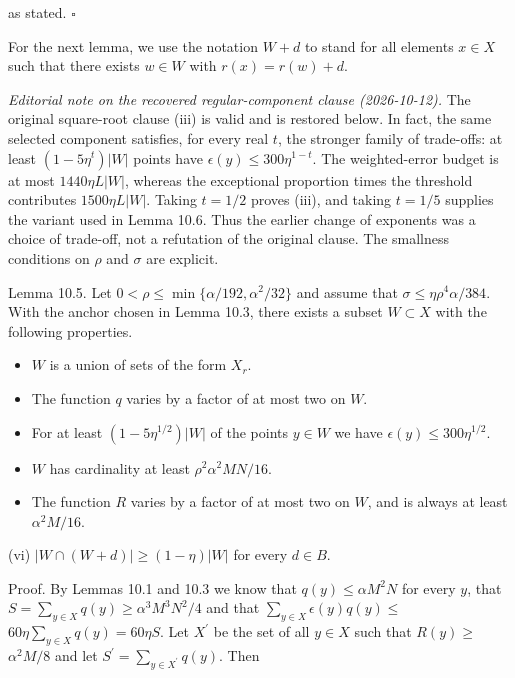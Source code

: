 \documentclass[10pt]{article}
\begin{document}
as stated. \(\square\)

For the next lemma, we use the notation $W+d$ to stand for all elements $x \in X$ such that there exists $w \in W$ with $r(x)=r(w)+d$.

\emph{Editorial note on the recovered regular-component clause (2026-10-12).}
The original square-root clause (iii) is valid and is restored below.
In fact, the same selected component satisfies, for every real $t$, the
stronger family of trade-offs: at least $(1-5\eta^t)|W|$ points have
$\epsilon(y)\leqslant300\eta^{1-t}$. The weighted-error budget is at most
$1440\eta L|W|$, whereas the exceptional proportion times the threshold
contributes $1500\eta L|W|$. Taking $t=1/2$ proves (iii), and taking
$t=1/5$ supplies the variant used in Lemma 10.6. Thus the earlier change
of exponents was a choice of trade-off, not a refutation of the original
clause. The smallness conditions on $\rho$ and $\sigma$ are explicit.

Lemma 10.5. Let $0<\rho\leqslant\min\{\alpha/192,\alpha^2/32\}$ and assume that $\sigma\leqslant\eta\rho^4\alpha/384$. With the anchor chosen in Lemma 10.3, there exists a subset $W \subset X$ with the following properties.

\begin{itemize}
  \item[(i)] $W$ is a union of sets of the form $X_{r}$.
  \item[(ii)] The function $q$ varies by a factor of at most two on $W$.
  \item[(iii)] For at least $\left(1-5 \eta^{1 / 2}\right)|W|$ of the points $y \in W$ we have $\epsilon(y) \leqslant 300 \eta^{1 / 2}$.
  \item[(iv)] $W$ has cardinality at least $\rho^{2} \alpha^{2} M N / 16$.
  \item[(v)] The function $R$ varies by a factor of at most two on $W$, and is always at least $\alpha^{2} M / 16$.
\end{itemize}

(vi) $|W \cap(W+d)| \geqslant(1-\eta)|W|$ for every $d \in B$.

Proof. By Lemmas 10.1 and 10.3 we know that $q(y) \leqslant \alpha M^{2} N$ for every $y$, that $S=\sum_{y \in X} q(y) \geqslant \alpha^{3} M^{3} N^{2} / 4$ and that $\sum_{y \in X} \epsilon(y) q(y) \leqslant$ $60 \eta \sum_{y \in X} q(y)=60 \eta S$. Let $X^{\prime}$ be the set of all $y \in X$ such that $R(y) \geqslant$ $\alpha^{2} M / 8$ and let $S^{\prime}=\sum_{y \in X^{\prime}} q(y)$. Then
\end{document}
